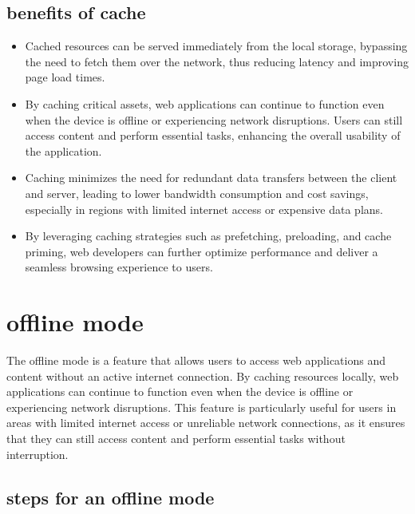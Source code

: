 \documentclass[12pt,a4paper, twosite]{article}
\begin{document}
\subsection{benefits of cache}
\label{sec:org2498090}

\begin{itemize}
  \item Cached resources can be served immediately from the local storage, bypassing the need to fetch them over the network, thus reducing latency and improving page load times.
  \item  By caching critical assets, web applications can continue to function even when the device is offline or experiencing network disruptions. Users can still access content and perform essential tasks, enhancing the overall usability of the application.
  \item Caching minimizes the need for redundant data transfers between the client and server, leading to lower bandwidth consumption and cost savings, especially in regions with limited internet access or expensive data plans.
  \item By leveraging caching strategies such as prefetching, preloading, and cache priming, web developers can further optimize performance and deliver a seamless browsing experience to users.
\end{itemize}

\section{offline mode}
\label{sec:orgf3b3b3b}
The offline mode is a feature that allows users to access web applications and content without an active internet connection. By caching resources locally, web applications can continue to function even when the device is offline or experiencing network disruptions. This feature is particularly useful for users in areas with limited internet access or unreliable network connections, as it ensures that they can still access content and perform essential tasks without interruption.

\subsection{steps for an offline mode}
\label{sec:orgf3b3b4b}
\end{document}
